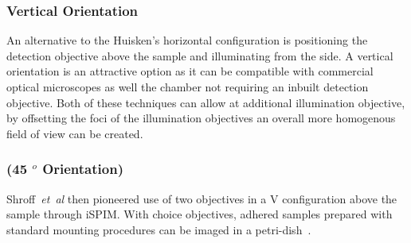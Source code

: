\subsubsection{Vertical Orientation}

An alternative to the Huisken's horizontal configuration is positioning the detection objective above the sample and illuminating from the side.
A vertical orientation is an attractive option as it can be compatible with commercial optical microscopes as well the chamber not requiring an inbuilt detection objective. %
Both of these techniques can allow at  additional illumination objective, by offsetting the foci of the illumination objectives an overall more homogenous field of view can be created.


\subsubsection{(45 $^o$ Orientation)}

Shroff~\emph{et~al} then pioneered use of two objectives in a V configuration above the sample through iSPIM.\@
With choice objectives, adhered samples prepared with standard mounting procedures can be imaged in a petri-dish~\cite{kumar_dual-view_2014}.


